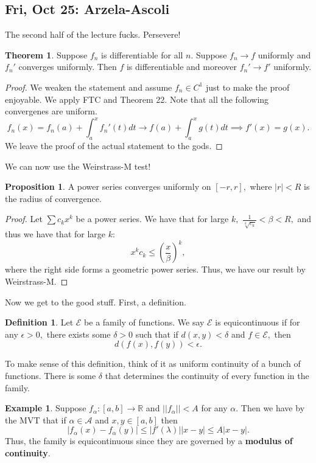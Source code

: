 \documentclass[10pt, oneside]{article}
\newcommand{\bbR}{\mathbb{R}}
\theoremstyle{definition}
\newtheorem{exmp}{Example}[section]
\newtheorem{thm}{Theorem}
\newtheorem{defn}{Definition}
\newtheorem{prop}{Proposition}
\begin{document}
\newpage

\subsection{Fri, Oct 25: Arzela-Ascoli}
The second half of the lecture fucks. Persevere!
\begin{thm}
Suppose $f_n$ is differentiable for all $n.$ Suppose $f_n \to f$ uniformly and $f_n'$ converges uniformly. Then $f$ is differentiable and moreover $f_n' \to f'$ uniformly. 
\end{thm}
\begin{proof}
    We weaken the statement and assume $f_n \in C^1$ just to make the proof enjoyable. We apply FTC and Theorem 22. Note that all the following convergenes are uniform.
    \[f_n(x) = f_n(a) + \int_a^x f_n'(t)dt \to f(a) + \int_a^x g(t)dt \implies f'(x) =  g(x).\] We leave the proof of the actual statement to the gods.
\end{proof}
We can now use the Weirstrass-M test!
\begin{prop}
    A power series converges uniformly on $[-r,r],$ where $|r|< R$ is the radius of convergence.
\end{prop}
\begin{proof}
    Let $\sum c_k x^k$ be a power series. We have that for large  $k,$ $ \frac{1}{\sqrt[k]{c_k}}< \beta <R,$ and thus we have that for large $k:$
    \[x^kc_k \leq \left(\frac{x}{\beta}\right)^{k},\] where the right side forms a geometric power series. Thus, we have our result by Weirstrass-M.
\end{proof}
Now we get to the good stuff. First, a definition.
\begin{defn}
    Let $\mathcal{E}$ be a family of functions. We say $\mathcal{E}$ is equicontinuous if for  any $\epsilon>0,$ there exists some $\delta>0$ such that if $d(x,y)< \delta$ and $f\in \mathcal{E},$ then \[d(f(x), f(y)) < \epsilon.\]
\end{defn}
To make sense of this definition, think of it as uniform continuity of a bunch of functions. There is some $\delta$ that determines the continuity of every function in the family.
\begin{exmp}
    Suppose $f_\alpha: [a,b]\to \bbR$ and $||f_{\alpha}||< A$ for any $\alpha.$ Then we have by the MVT that if $\alpha \in \mathcal{A}$ and $x,y \in [a,b]$ then
    \[|f_\alpha(x)- f_\alpha(y)| \leq |f'(\lambda)||x-y|\leq A|x-y|.\] Thus, the family is equicontinuous since they are governed by a \textbf{modulus of continuity}.
\end{exmp}
\end{document}
